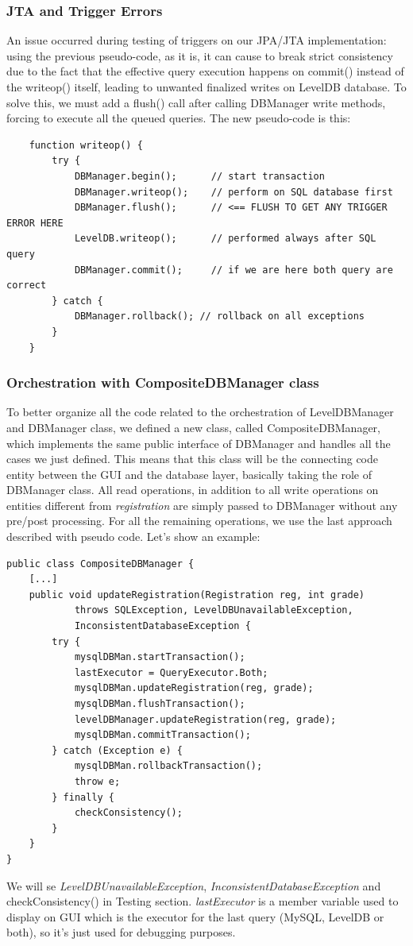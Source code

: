 \documentclass{report}
\begin{document}
\subsubsection{JTA and Trigger Errors}
An issue occurred during testing of triggers on our JPA/JTA implementation: using the previous pseudo-code, as it is, it can cause to break strict consistency due to the fact that the effective query execution happens on commit() instead of the writeop() itself, leading to unwanted finalized writes on LevelDB database. To solve this, we must add a flush() call after calling DBManager write methods, forcing to execute all the queued queries. The new pseudo-code is this:
\begin{lstlisting}
	function writeop() {
		try {
			DBManager.begin();		// start transaction
			DBManager.writeop(); 	// perform on SQL database first
			DBManager.flush();		// <== FLUSH TO GET ANY TRIGGER ERROR HERE
			LevelDB.writeop();		// performed always after SQL query
			DBManager.commit();		// if we are here both query are correct
		} catch {
			DBManager.rollback(); // rollback on all exceptions
		}
	}
\end{lstlisting}


\subsubsection*{Orchestration with CompositeDBManager class}
To better organize all the code related to the orchestration of LevelDBManager and DBManager class, we defined a new class, called CompositeDBManager, which implements the same public interface of DBManager and handles all the cases we just defined. This means that this class will be the connecting code entity between the GUI and the database layer, basically taking the role of DBManager class. All read operations, in addition to all write operations on entities different from \textit{registration} are simply passed to DBManager without any pre/post processing. For all the remaining operations, we use the last approach described with pseudo code. Let's show an example:
\begin{lstlisting}
public class CompositeDBManager {
	[...]
	public void updateRegistration(Registration reg, int grade)
			throws SQLException, LevelDBUnavailableException,
			InconsistentDatabaseException {
		try {
			mysqlDBMan.startTransaction();
			lastExecutor = QueryExecutor.Both;
			mysqlDBMan.updateRegistration(reg, grade);
			mysqlDBMan.flushTransaction();
			levelDBManager.updateRegistration(reg, grade);
			mysqlDBMan.commitTransaction();
		} catch (Exception e) {
			mysqlDBMan.rollbackTransaction();
			throw e;
		} finally {
			checkConsistency();
		}
	}
}
\end{lstlisting}
We will se \textit{LevelDBUnavailableException}, \textit{InconsistentDatabaseException} and checkConsistency() in Testing section. \textit{lastExecutor} is a member variable used to display on GUI which is the executor for the last query (MySQL, LevelDB or both), so it's just used for debugging purposes.
\end{document}
